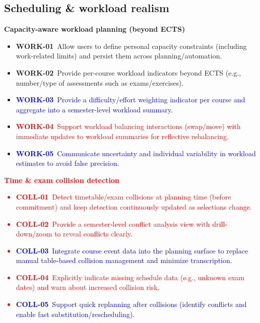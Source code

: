 \subsection*{Scheduling \& workload realism}

\textbf{Capacity-aware workload planning (beyond ECTS)}
\begin{itemize}
  \item \textbf{WORK-01}~Allow users to define personal capacity constraints (including work-related limits) and persist them across planning/automation.
  \item \textbf{WORK-02}~Provide per-course workload indicators beyond ECTS (e.g., number/type of assessments such as exams/exercises).
  \item \textcolor{blue}{\textbf{WORK-03}~Provide a difficulty/effort weighting indicator per course and aggregate into a semester-level workload summary.}
  \item \textcolor{red}{\textbf{WORK-04}~Support workload balancing interactions (swap/move) with immediate updates to workload summaries for reflective rebalancing.}
  \item \textcolor{blue}{\textbf{WORK-05}~Communicate uncertainty and individual variability in workload estimates to avoid false precision.}
\end{itemize}

\textcolor{red}{\textbf{Time \& exam collision detection}
\begin{itemize}
  \item \textbf{COLL-01}~Detect timetable/exam collisions at planning time (before commitment) and keep detection continuously updated as selections change.
  \item \textbf{COLL-02}~Provide a semester-level conflict analysis view with drill-down/zoom to reveal conflicts clearly.
  \item \textcolor{blue}{\textbf{COLL-03}~Integrate course event data into the planning surface to replace manual table-based collision management and minimize transcription.}
  \item \textbf{COLL-04}~Explicitly indicate missing schedule data (e.g., unknown exam dates) and warn about increased collision risk.
  \item \textcolor{blue}{\textbf{COLL-05}~Support quick replanning after collisions (identify conflicts and enable fast substitution/rescheduling).}
\end{itemize}}

